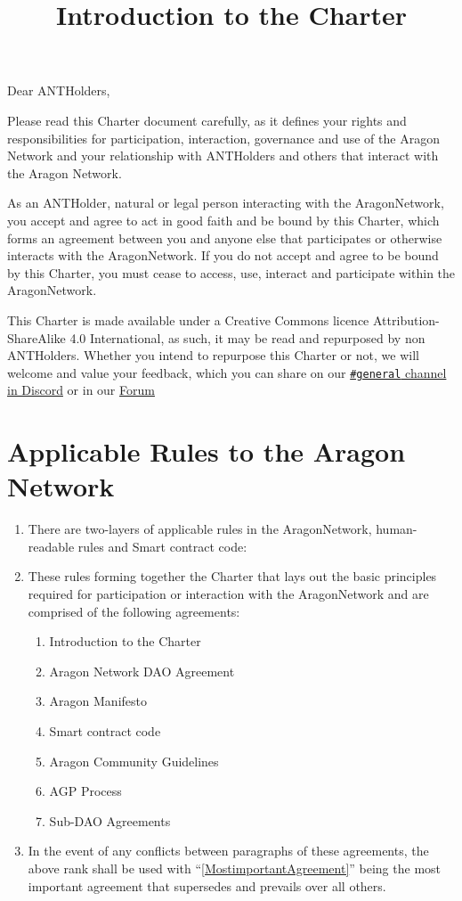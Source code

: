 
\title{Introduction to the Charter}



\mytitle

Dear \glspl{ANTHolder},

Please read this Charter document carefully, as it defines your rights and responsibilities for participation, interaction, governance and use of the Aragon Network and your relationship with \glspl{ANTHolder} and others that interact with the Aragon Network.

As an \gls{ANTHolder}, natural or legal person interacting with the \gls{AragonNetwork}, you accept and agree to act in good faith and be bound by this Charter, which forms an agreement between you and anyone else that participates or otherwise interacts with the \gls{AragonNetwork}.
If you do not accept and agree to be bound by this Charter, you must cease to access, use, interact and participate within the \gls{AragonNetwork}.

This Charter is made available under a Creative Commons licence Attribution-Share\-Alike 4.0 International, as such, it may be read and repurposed by non \glspl{ANTHolder}.
Whether you intend to repurpose this Charter or not, we will welcome and value your feedback, which you can share on our \href{https://discord.com/invite/eqQJkdp}{\texttt{\#general} channel in Discord} or in our \href{https://forum.aragon.org/}{Forum} 


\section{Applicable Rules to the Aragon Network}

\begin{enumerate}
	\item There are two-layers of applicable rules in the \gls{AragonNetwork}, human-readable rules and Smart contract code:
	\item These rules forming together the Charter that lays out the basic principles required for participation or interaction with the \gls{AragonNetwork} and are comprised of the following agreements:
	\begin{enumerate}
		\item Introduction to the Charter \label{MostimportantAgreement}
		\item Aragon Network \ac{DAO} Agreement
		\item Aragon Manifesto
		\item Smart contract code
		\item Aragon Community Guidelines
		\item \ac{AGP} Process
		\item Sub-DAO Agreements
	\end{enumerate}
	\item In the event of any conflicts between paragraphs of these agreements, the above
	rank shall be used with “\ref{MostimportantAgreement}” being the most important agreement that supersedes and prevails over all others.
\end{enumerate}


